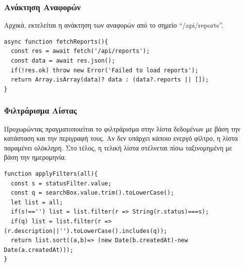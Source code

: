 \subsubsection*{Ανάκτηση Αναφορών}
Αρχικά, εκτελείται η ανάκτηση των αναφορών από το σημείο “/api/reports”.
\begin{lstlisting}
async function fetchReports(){
  const res = await fetch('/api/reports');
  const data = await res.json();
  if(!res.ok) throw new Error('Failed to load reports');
  return Array.isArray(data)? data : (data?.reports || []);
}
\end{lstlisting}

\subsubsection*{Φιλτράρισμα Λίστας}
Προχωρώντας πραγματοποιείται το φιλτράρισμα στην λίστα δεδομένων με βάση την κατάσταση και την περιγραφή τους. Αν δεν υπάρχει κάποιο ενεργό φίλτρο, η λίστα παραμένει ολόκληρη. Στο τέλος, η τελική λίστα στέλνεται πίσω ταξινομημένη με βάση την ημερομηνία.
\\
\begin{lstlisting}
function applyFilters(all){
  const s = statusFilter.value;
  const q = searchBox.value.trim().toLowerCase();
  let list = all;
  if(s!=='') list = list.filter(r => String(r.status)===s);
  if(q) list = list.filter(r => (r.description||'').toLowerCase().includes(q));
  return list.sort((a,b)=> (new Date(b.createdAt)-new Date(a.createdAt)));
}
\end{lstlisting}

